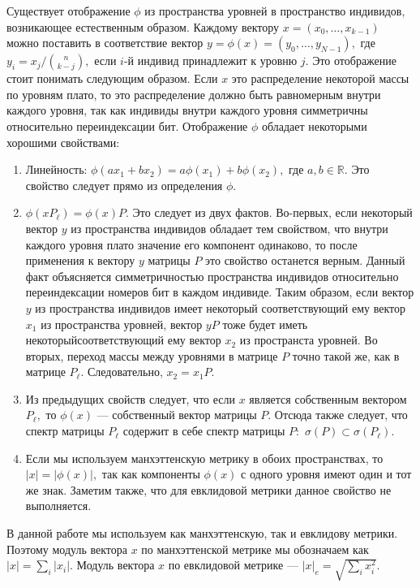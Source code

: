 \documentclass[russian]{article}
\begin{document}
Существует отображение $\phi$ из пространства уровней в пространство индивидов, возникающее естественным образом. Каждому вектору $x = (x_0, \dots, x_{k - 1})$ можно поставить в соответствие вектор $y = \phi(x) = (y_0, \dots, y_{N - 1}),$ где $y_i = x_j / \binom{n}{k - j}, $ если $i$-й индивид принадлежит к уровню $j$. Это отображение стоит понимать следующим образом. Если $x$ это распределение некоторой массы по уровням плато, то это распределение должно быть равномерным внутри каждого уровня, так как индивиды внутри каждого уровня симметричны относительно переиндексации бит. Отображение $\phi$ обладает некоторыми хорошими свойствами:

\begin{enumerate}
  \item Линейность: $\phi(a x_1 + b x_2) = a \phi(x_1) + b \phi(x_2),$ где $a, b \in \mathbb{R}.$ Это свойство следует прямо из определения $\phi.$
  \item $\phi(x P_\ell) = \phi(x) P.$ Это следует из двух фактов. Во-первых, если некоторый вектор $y$ из пространства индивидов обладает тем свойством, что внутри каждого уровня плато значение его компонент одинаково, то после применения к вектору $y$ матрицы $P$ это свойство останется верным. Данный факт объясняется симметричностью пространства индивидов относительно переиндексации номеров бит в каждом индивиде. Таким образом, если вектор $y$ из пространства индивидов имеет некоторый соответствующий ему вектор $x_1$ из пространства уровней, вектор $yP$ тоже будет иметь некоторыйсоответствующий ему вектор $x_2$ из пространста уровней. Во вторых, переход массы между уровнями в матрице $P$ точно такой же, как в матрице $P_\ell.$ Следовательно, $x_2 = x_1 P.$
  \item Из предыдущих свойств следует, что если $x$ является собственным вектором $P_\ell,$ то $\phi(x)$ --- собственный вектор матрицы $P.$ Отсюда также следует, что спектр матрицы $P_\ell$ содержит в себе спектр матрицы $P:$ $\sigma(P) \subset \sigma(P_\ell).$
  \item Если мы используем манхэттенскую метрику в обоих пространствах, то $|x| = |\phi(x)|,$ так как компоненты $\phi(x)$ с одного уровня имеют один и тот же знак. Заметим также, что для евклидовой метрики данное свойство не выполняется.
\end{enumerate}

В данной работе мы используем как манхэттенскую, так и евклидову метрики. Поэтому модуль вектора $x$ по манхэттенской метрике мы обозначаем как $|x| = \sum\limits_{i} |x_i|.$ Модуль вектора $x$ по евклидовой метрике --- $|x|_e = \sqrt{\sum\limits_i x_i^2}.$
\end{document}
